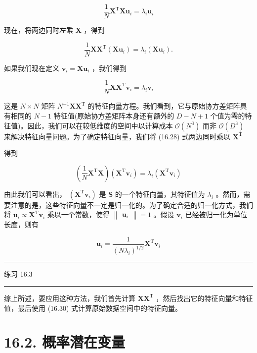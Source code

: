 \documentclass[10pt]{report}
\newcommand{\HRule}{\begin{center}\rule{0.9\linewidth}{0.2mm}\end{center}}
\begin{document}
\[
\frac{1}{N}{\mathbf{X}}^{\mathrm{T}}\mathbf{X}{\mathbf{u}}_{i} = {\lambda }_{i}{\mathbf{u}}_{i} \tag{16.26}
\]

现在，将两边同时左乘 \(\mathbf{X}\) ，得到

\[
\frac{1}{N}\mathbf{X}{\mathbf{X}}^{\mathrm{T}}\left( {\mathbf{X}{\mathbf{u}}_{i}}\right)  = {\lambda }_{i}\left( {\mathbf{X}{\mathbf{u}}_{i}}\right) . \tag{16.27}
\]

如果我们现在定义 \({\mathbf{v}}_{i} = \mathbf{X}{\mathbf{u}}_{i}\) ，我们得到

\[
\frac{1}{N}\mathbf{X}{\mathbf{X}}^{\mathrm{T}}{\mathbf{v}}_{i} = {\lambda }_{i}{\mathbf{v}}_{i} \tag{16.28}
\]

这是 \(N \times  N\) 矩阵 \({N}^{-1}\mathbf{X}{\mathbf{X}}^{\mathrm{T}}\) 的特征向量方程。我们看到，它与原始协方差矩阵具有相同的 \(N - 1\) 特征值(原始协方差矩阵本身还有额外的 \(D - N + 1\) 个值为零的特征值)。因此，我们可以在较低维度的空间中以计算成本 \(\mathcal{O}\left( {N}^{3}\right)\) 而非 \(\mathcal{O}\left( {D}^{3}\right)\) 来解决特征向量问题。为了确定特征向量，我们将 (16.28) 式两边同时乘以 \({\mathbf{X}}^{\mathrm{T}}\)

得到

\[
\left( {\frac{1}{N}{\mathbf{X}}^{\mathrm{T}}\mathbf{X}}\right) \left( {{\mathbf{X}}^{\mathrm{T}}{\mathbf{v}}_{i}}\right)  = {\lambda }_{i}\left( {{\mathbf{X}}^{\mathrm{T}}{\mathbf{v}}_{i}}\right)  \tag{16.29}
\]

由此我们可以看出， \(\left( {{\mathbf{X}}^{\mathrm{T}}{\mathbf{v}}_{i}}\right)\) 是 \(\mathbf{S}\) 的一个特征向量，其特征值为 \({\lambda }_{i}\) 。然而，需要注意的是，这些特征向量不一定是归一化的。为了确定合适的归一化方式，我们将 \({\mathbf{u}}_{i} \propto  {\mathbf{X}}^{\mathrm{T}}{\mathbf{v}}_{i}\) 乘以一个常数，使得 \(\begin{Vmatrix}{\mathbf{u}}_{i}\end{Vmatrix} = 1\) 。假设 \({\mathbf{v}}_{i}\) 已经被归一化为单位长度，则有

\[
{\mathbf{u}}_{i} = \frac{1}{{\left( N{\lambda }_{i}\right) }^{1/2}}{\mathbf{X}}^{\mathrm{T}}{\mathbf{v}}_{i} \tag{16.30}
\]

\HRule

练习 16.3

\HRule

综上所述，要应用这种方法，我们首先计算 \(\mathbf{X}{\mathbf{X}}^{\mathrm{T}}\) ，然后找出它的特征向量和特征值，最后使用 (16.30) 式计算原始数据空间中的特征向量。

\section*{16.2. 概率潜在变量}
\end{document}
